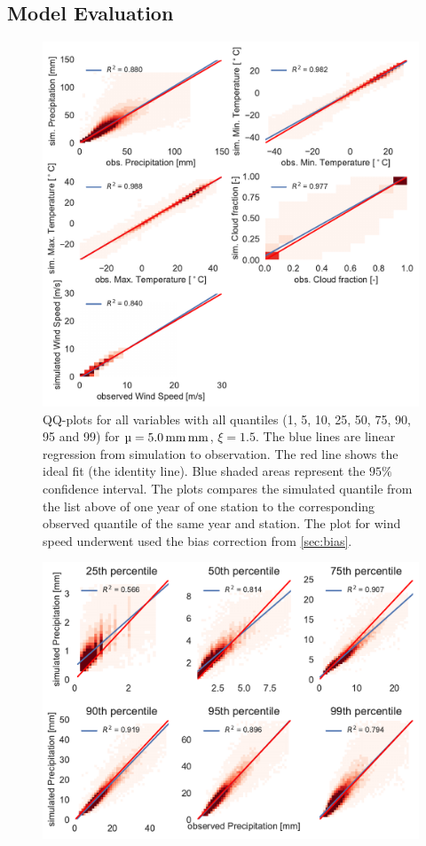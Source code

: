 \documentclass[
11pt, %
english, %
singlespacing, %
headsepline, %
]{MastersDoctoralThesis} %
\makeatletter
\DeclareRobustCommand*\unit[1]%
{\ensuremath{%
		{\thinmuskip3mu\relax
			\def\mu{\text{\textmu}}\def~{\,}%
			\ifx\f@series\testbx\mathbf{#1}\else\mathrm{#1}\fi}}}
\makeatother
\begin{document}
\begin{NoHyper}
\begin{refsection}
\subsection{Model Evaluation} \label{sec:eval}
\begin{figure}
	\includegraphics[width=\linewidth]{gwgen-figures/f12.pdf}
	\caption[QQ-plots for all variables and all quantiles]{QQ-plots for all variables with all quantiles (1, 5, 10, 25, 50, 75, 90, 95 and 99) for ${\mu=5.0\,\unit{mm}\, \mathrm{mm}}$, $\xi=1.5$. The blue lines are linear regression from simulation to observation. The red line shows the ideal fit (the identity line). Blue shaded areas represent the $95\%$ confidence interval. The plots compares the simulated quantile from the list above of one year of one station to the corresponding observed quantile of the same year and station. The plot for wind speed underwent used the bias correction from \autoref{sec:bias}.}
	\label{fig:all_quants}
\end{figure}
\begin{figure}
	\includegraphics[width=\linewidth]{gwgen-figures/f13.pdf}

\end{figure}
\end{refsection}
\end{NoHyper}
\end{document}
